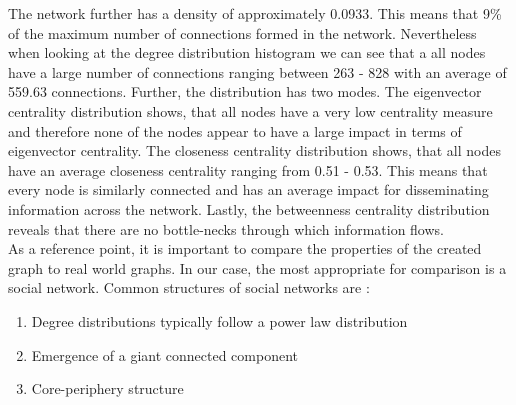   \noindent The network further has a density of approximately 0.0933. This
  means that 9\% of the maximum number of connections formed in the network.
  Nevertheless when looking at the degree distribution histogram we can see 
  that a all nodes have a large number of connections ranging between 263 -
  828 with an average of 559.63 connections. Further, the distribution has two
  modes. The eigenvector centrality distribution shows, that all nodes have a
  very low centrality measure and therefore none of the nodes appear to have a
  large impact in terms of eigenvector centrality. The closeness centrality
  distribution shows, that all nodes have an average closeness centrality
  ranging from 0.51 - 0.53. This means that every node is similarly connected
  and has an average impact for disseminating information across the network.
  Lastly, the betweenness centrality distribution reveals that there are no
  bottle-necks through which information flows. \\

  \noindent As a reference point, it is important to compare the properties of
  the created graph to real world graphs. In our case, the most appropriate for
  comparison is a social network. Common structures of social networks are
  \citep{watts1998collective,newman2006structure,Newman2010,
  kim2012multiplicative}:

  \begin{enumerate}
    \item Degree distributions typically follow a power law distribution
    \item Emergence of a giant connected component
    \item Core-periphery structure
  \end{enumerate}

